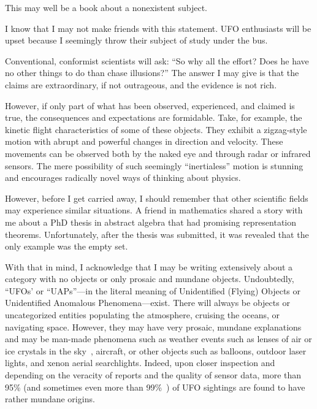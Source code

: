 %
%

\preface


This may well be a book about a nonexistent subject.

I know that I may not make friends with this statement. UFO enthusiasts will be upset because I seemingly throw their subject of study under the bus.

Conventional, conformist scientists will ask: ``So why all the effort? Does he have no other things to do than chase illusions?''
The answer I may give is that the claims are extraordinary, if not outrageous, and the evidence is not rich.

However, if only part of what has been observed, experienced, and claimed is true, the consequences and expectations are formidable.
Take, for example, the kinetic flight characteristics of some of these objects.
They exhibit a zigzag-style motion with abrupt and powerful changes in direction and velocity.
These movements can be observed both by the naked eye and through radar or infrared sensors.
The mere possibility of such seemingly ``inertialess'' motion is stunning and encourages radically
novel ways of thinking about physics.

However, before I get carried away, I should remember that other scientific fields may experience similar situations.
A friend in mathematics shared a story with me about a PhD thesis in abstract algebra that had promising representation theorems.
Unfortunately, after the thesis was submitted, it was revealed that the only example was the empty set.

With that in mind, I acknowledge that I may be writing extensively about a category with no objects or only prosaic and mundane objects.
Undoubtedly, ``UFOs' or ``UAPs''---in the literal meaning of Unidentified (Flying) Objects or Unidentified Anomalous Phenomena---exist.
There will always be objects or uncategorized entities populating the atmosphere, cruising the oceans, or navigating space.
However, they may have very prosaic, mundane explanations and may be man-made phenomena such as weather events such as lenses of air or
ice crystals in the sky~\cite{Menzel_1953}, aircraft, or other objects such as balloons, outdoor laser lights, and xenon aerial searchlights.
Indeed, upon closer inspection and
depending on the veracity of reports and the quality of sensor data, more than 95{\%}
(and sometimes even more than 99{\%}~\cite{AA-Condon-1970})
of UFO sightings are found to have rather mundane origins.

